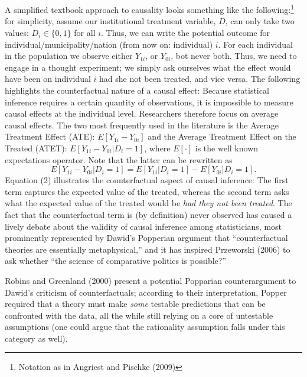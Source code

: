 \documentclass[12pt]{article}%
\begin{document}
\section{}
A simplified textbook approach to causality looks something like the following:\footnote{Notation as in Angriest and Pischke (2009)} for simplicity, assume our institutional treatment variable, $D$, can only take two values: $D_i \in \{0,1\}$ for all $i$. Thus, we can write the potential outcome for individual/municipality/nation (from now on: individual) $i$. For each individual in the population we observe either $Y_{1i}$, or $Y_{0i}$, bot never both. Thus, we need to engage in a thought experiment; we simply ask ourselves what the effect would have been on individual $i$ had she not been treated, and vice versa. The following highlights the counterfactual nature of a causal effect: Because statistical inference requires a certain quantity of observations, it is impossible to measure causal effects at the individual level. Researchers therefore focus on average causal effects. The two most frequently used in the literature is the Average Treatment Effect (ATE): $E[Y_{1i}-Y_{0i}]$ and the Average Treatment Effect on the Treated (ATET): $E[Y_{1i}-Y_{0i}
|D_i=1 ]$, where $E[\cdot]$ is the well known expectations operator. Note that the latter can be rewritten as
\begin{equation}
E[Y_{1i}-Y_{0i}|D_i=1 ]=E[Y_{1i}
|D_i=1 ]-E[Y_{0i}
|D_i=1 ].
\end{equation}
Equation (2) illustrates the counterfactual aspect of causal inference: The first term captures the expected value of the treated, whereas the second term asks what the expected value of the treated would be \textit{had they not been treated}. The fact that the counterfactual term is (by definition) never observed has caused a lively debate about the validity of causal inference among statisticians, most prominently represented by Dawid's Popperian argument that ``counterfactual theories are essentially metaphysical,'' and it has inspired Przeworski (2006) to ask whether ``the science of comparative politics is possible?''

Robins and Greenland (2000) present a potential Popparian counterargument to Dawid's criticism of counterfactuals; according to their interpretation, Popper required that a theory must make \textit{some} testable predictions that can be confronted with the data, all the while still relying on a core of untestable assumptions (one could argue that the rationality assumption falls under this category as well). \\
\end{document}
